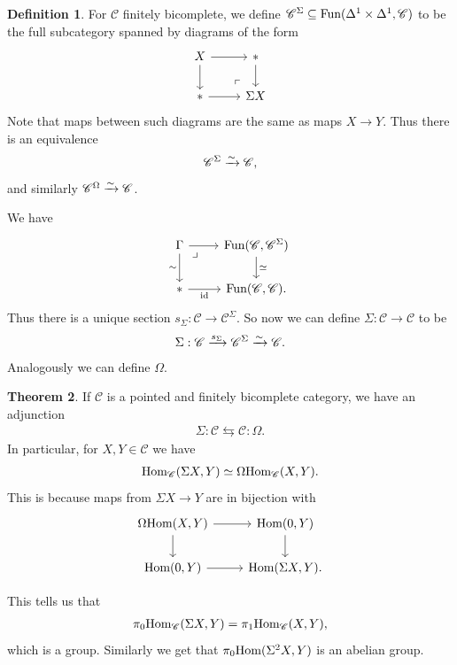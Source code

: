 \documentclass[12pt]{amsart}
\theoremstyle{definition}
\newtheorem{theorem}{Theorem}[section]
\newtheorem{definition}[theorem]{Definition}
\begin{document}
\begin{definition} For $\mathscr{C}$ finitely bicomplete, we define $\mathscr{C}^\Sigma \subseteq \text{Fun}(\Delta^1 \times \Delta^1, \mathscr{C})$ to be the full subcategory spanned by diagrams of the form
\[\begin{tikzcd}
    X\rar\dar & \ast\dar\\
    \ast\rar & \Sigma X \po
\end{tikzcd} \]
Note that maps between such diagrams are the same as maps $X \to Y$. Thus there is an equivalence
\begin{align*}
    \mathscr{C}^\Sigma \xrightarrow{\sim} \mathscr{C},
\end{align*}
and similarly $\mathscr{C}^\Omega \xrightarrow{\sim} \mathscr{C}$.
\end{definition}

We have
\[ \begin{tikzcd}
    \Gamma\dar["\sim" left]\rar\pb & \Fun(\mathscr{C},\mathscr{C}^\Sigma)\dar["\simeq" right]\\
    \ast\rar["\id" below] & \Fun(\mathscr{C},\mathscr{C}).
\end{tikzcd} \]
Thus there is a unique section $s_\Sigma: \mathscr{C} \to \mathscr{C}^\Sigma$. So now we can define $\Sigma: \mathscr{C} \to \mathscr{C}$ to be
\begin{align*}
    \Sigma: \mathscr{C} \xrightarrow{s_\Sigma} \mathscr{C}^\Sigma \xrightarrow{\sim} \mathscr{C}.
\end{align*}
Analogously we can define $\Omega$.

\begin{theorem} If $\mathscr{C}$ is a pointed and finitely bicomplete category, we have an adjunction
\begin{align*}
    \Sigma: \mathscr{C} \leftrightarrows \mathscr{C}: \Omega.
\end{align*}
In particular, for $X,Y\in \mathscr{C}$ we have
\begin{align*}
    \text{Hom}_\mathscr{C}(\Sigma X, Y) \simeq \Omega \text{Hom}_\mathscr{C}(X,Y).
\end{align*}
This is because maps from $\Sigma X \to Y$ are in bijection with
\[ \begin{tikzcd}
    \Omega \Hom(X,Y)\rar\dar & \Hom(0,Y)\dar\\
    \Hom(0,Y)\rar & \Hom(\Sigma X, Y).
\end{tikzcd} \]
\end{theorem}

This tells us that
\begin{align*}
    \pi_0 \text{Hom}_\mathscr{C}(\Sigma X, Y) = \pi_1 \text{Hom}_\mathscr{C}(X,Y),
\end{align*}
which is a group. Similarly we get that $\pi_0 \text{Hom}(\Sigma^2 X, Y)$ is an abelian group.
\end{document}
